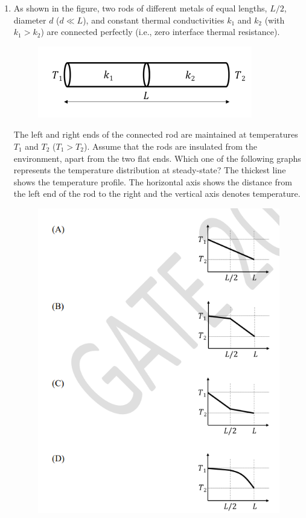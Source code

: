 \documentclass[journal]{IEEEtran}
\theoremstyle{remark}
\begin{document}
\begin{enumerate}[resume]
\item As shown in the figure, two rods of different metals of equal lengths, $L/2$, diameter $d$ ($d \ll L$), and constant thermal conductivities $k_1$ and $k_2$ (with $k_1 > k_2$) are connected perfectly (i.e., zero interface thermal resistance).
\begin{figure}[H]
    \centering
    \includegraphics[width=0.5\columnwidth]{figs/Q.15(1).png}
    \caption{}
    \label{fig:placeholder}
\end{figure}
The left and right ends of the connected rod are maintained at temperatures $T_1$ and $T_2$ ($T_1 > T_2$). Assume that the rods are insulated from the environment, apart from the two flat ends. Which one of the following graphs represents the temperature distribution at steady-state? The thickest line shows the temperature profile. The horizontal axis shows the distance from the left end of the rod to the right and the vertical axis denotes temperature. \hfill{}
\begin{figure}[H]
    \centering
    \includegraphics[width=0.7\columnwidth]{figs/Q.15(2).png}
    \caption{}
    \label{fig:placeholder}
\end{figure}




\end{enumerate}
\end{document}
